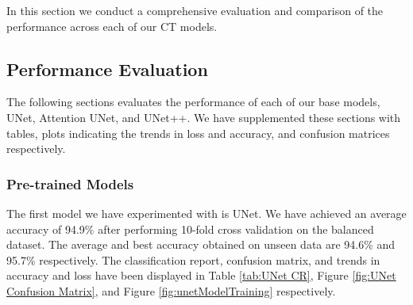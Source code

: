 In this section we conduct a comprehensive evaluation and comparison of the performance across each of our CT models.
    \vspace{-1em}
\subsection{Performance Evaluation}

The following sections evaluates the performance of each of our base models, UNet, Attention UNet, and UNet++. We have supplemented these sections with tables, plots indicating the trends in loss and accuracy, and confusion matrices respectively. 
    \vspace{-1em}

\subsubsection{Pre-trained Models}

The first model we have experimented with is UNet. We have achieved an average accuracy of 94.9\% after performing 10-fold cross validation on the balanced dataset. The average and best accuracy obtained on unseen data are 94.6\% and 95.7\% respectively. The classification report, confusion matrix, and trends in accuracy and loss have been displayed in Table \ref{tab:UNet CR}, Figure \ref{fig:UNet Confusion Matrix}, and Figure \ref{fig:unetModelTraining} respectively.


